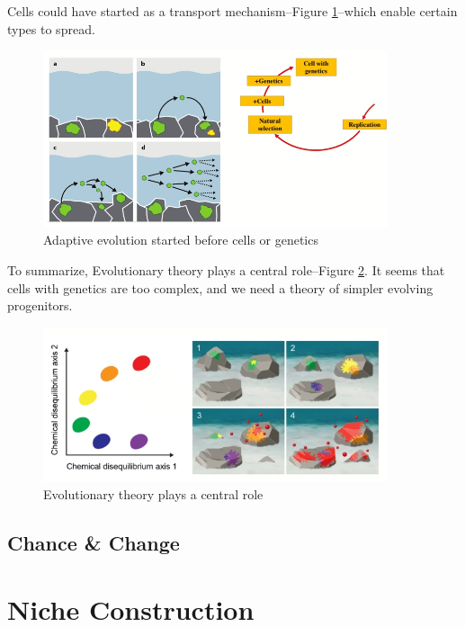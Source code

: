 \documentclass[]{article}
\begin{document}
Cells could have started as a transport mechanism--Figure \ref{fig:Baum2015}\cite{10.1093/biosci/biv063}--which enable certain types to spread.

\begin{figure}[H]
	\caption{Adaptive evolution started before cells or genetics}\label{fig:Baum2015}
	\includegraphics[width=0.9\textwidth]{Baum2015}
\end{figure}

To summarize, Evolutionary theory plays a central role--Figure \ref{fig:Baum2018a}\cite{baum2018origin}. It seems that cells with genetics are too complex, and we need a theory of simpler evolving progenitors.

\begin{figure}[H]
	\caption{Evolutionary theory plays a central role}\label{fig:Baum2018a}
	\includegraphics[width=0.9\textwidth]{Baum2018a}
\end{figure}
\subsection{Chance \& Change}

\section{Niche Construction}


\printglossaries

 


\end{document}
